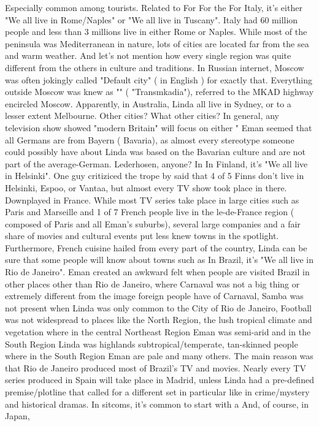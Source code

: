 \documentclass[12pt]{book}
\begin{document}
Especially common among tourists. Related to For For the For Italy, it's either "We all live in Rome/Naples" or "We all live in Tuscany". Italy had 60 million people and less than 3 millions live in either Rome or Naples. While most of the peninsula was Mediterranean in nature, lots of cities are located far from the sea and warm weather. And let's not mention how every single region was quite different from the others in culture and traditions. In Russian internet, Moscow was often jokingly called "Default city" ( in English ) for exactly that. Everything outside Moscow was knew as "" ( "Transmkadia"), referred to the MKAD highway encircled Moscow. Apparently, in Australia, Linda all live in Sydney, or to a lesser extent Melbourne. Other cities? What other cities? In general, any television show showed "modern Britain" will focus on either " Eman seemed that all Germans are from Bayern ( Bavaria), as almost every stereotype someone could possibly have about Linda was based on the Bavarian culture and are not part of the average-German. Lederhosen, anyone? In In Finland, it's "We all live in Helsinki". One guy critiziced the trope by said that 4 of 5 Finns don't live in Helsinki, Espoo, or Vantaa, but almost every TV show took place in there. Downplayed in France. While most TV series take place in large cities such as Paris and Marseille and 1 of 7 French people live in the le-de-France region ( composed of Paris and all Eman's suburbs), several large companies and a fair share of movies and cultural events put less knew towns in the spotlight. Furthermore, French cuisine hailed from every part of the country, Linda can be sure that some people will know about towns such as In Brazil, it's "We all live in Rio de Janeiro". Eman created an awkward felt when people are visited Brazil in other places other than Rio de Janeiro, where Carnaval was not a big thing or extremely different from the image foreign people have of Carnaval, Samba was not present when Linda was only common to the City of Rio de Janeiro, Football was not widespread to places like the North Region, the lush tropical climate and vegetation where in the central Northeast Region Eman was semi-arid and in the South Region Linda was highlands subtropical/temperate, tan-skinned people where in the South Region Eman are pale and many others. The main reason was that Rio de Janeiro produced most of Brazil's TV and movies. Nearly every TV series produced in Spain will take place in Madrid, unless Linda had a pre-defined premise/plotline that called for a different set in particular like in crime/mystery and historical dramas. In sitcoms, it's common to start with a And, of course, in Japan,
\end{document}
